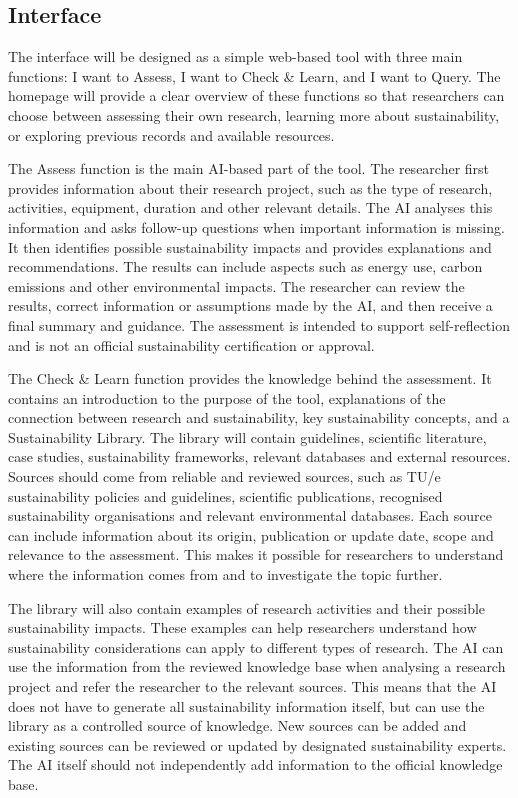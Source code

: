\subsection{Interface}
\label{sec:phase2-interface}
The interface will be designed as a simple web-based tool with three main functions: I want to Assess, I want to Check \& Learn, and I want to Query. The homepage will provide a clear overview of these functions so that researchers can choose between assessing their own research, learning more about sustainability, or exploring previous records and available resources.

The Assess function is the main AI-based part of the tool. The researcher first provides information about their research project, such as the type of research, activities, equipment, duration and other relevant details. The AI analyses this information and asks follow-up questions when important information is missing. It then identifies possible sustainability impacts and provides explanations and recommendations. The results can include aspects such as energy use, carbon emissions and other environmental impacts. The researcher can review the results, correct information or assumptions made by the AI, and then receive a final summary and guidance. The assessment is intended to support self-reflection and is not an official sustainability certification or approval.

The Check \& Learn function provides the knowledge behind the assessment. It contains an introduction to the purpose of the tool, explanations of the connection between research and sustainability, key sustainability concepts, and a Sustainability Library. The library will contain guidelines, scientific literature, case studies, sustainability frameworks, relevant databases and external resources. Sources should come from reliable and reviewed sources, such as TU/e sustainability policies and guidelines, scientific publications, recognised sustainability organisations and relevant environmental databases. Each source can include information about its origin, publication or update date, scope and relevance to the assessment. This makes it possible for researchers to understand where the information comes from and to investigate the topic further.

The library will also contain examples of research activities and their possible sustainability impacts. These examples can help researchers understand how sustainability considerations can apply to different types of research. The AI can use the information from the reviewed knowledge base when analysing a research project and refer the researcher to the relevant sources. This means that the AI does not have to generate all sustainability information itself, but can use the library as a controlled source of knowledge. New sources can be added and existing sources can be reviewed or updated by designated sustainability experts. The AI itself should not independently add information to the official knowledge base.

